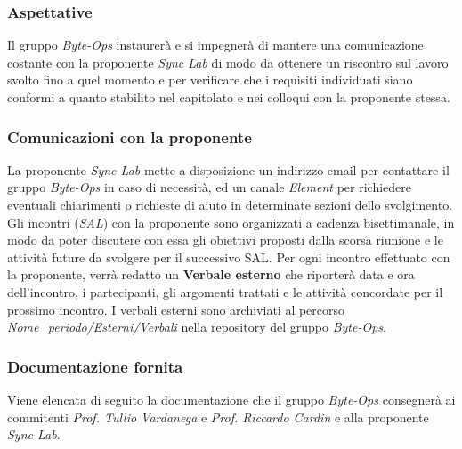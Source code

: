 \subsubsection{Aspettative}
Il gruppo \textit{Byte-Ops} instaurerà e si impegnerà di mantere una comunicazione costante con la proponente \textit{Sync Lab} di modo da ottenere un riscontro sul lavoro svolto fino a quel momento e per verificare che i requisiti individuati siano conformi a quanto stabilito nel capitolato e nei colloqui con la proponente stessa.\\

\subsubsection{Comunicazioni con la proponente}
La proponente \textit{Sync Lab} mette a disposizione un indirizzo email per contattare il gruppo \textit{Byte-Ops} in caso di necessità, ed un canale \textit{Element} per richiedere eventuali chiarimenti o richieste di aiuto in determinate sezioni dello svolgimento.\\
Gli incontri (\textit{SAL}) con la proponente sono organizzati a cadenza bisettimanale, in modo da poter discutere con essa gli obiettivi proposti dalla scorsa riunione e le attività future da svolgere per il successivo SAL.
Per ogni incontro effettuato con la proponente, verrà redatto un \textbf{Verbale esterno} che riporterà data e ora dell'incontro, i partecipanti, gli argomenti trattati e le attività concordate per il prossimo incontro.
I verbali esterni sono archiviati al percorso \textit{Nome\_periodo/Esterni/Verbali} nella \href{https://github.com/ByteOps-swe/Documents}{repository} del gruppo \textit{Byte-Ops}.

\subsubsection {Documentazione fornita}
Viene elencata di seguito la documentazione che il gruppo \textit{Byte-Ops} consegnerà ai commitenti \textit{Prof. Tullio Vardanega} e \textit{Prof. Riccardo Cardin} e alla proponente \textit{Sync Lab}.

